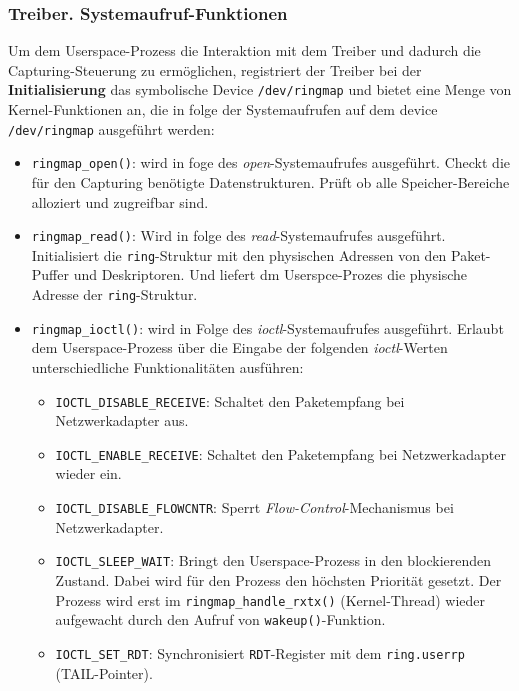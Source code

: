 \subsubsection*{Treiber. Systemaufruf-Funktionen}
Um dem Userspace-Prozess die Interaktion mit dem Treiber und dadurch die
Capturing-Steuerung zu ermöglichen, registriert der Treiber bei der
\textbf{Initialisierung} das symbolische Device \verb+/dev/ringmap+ und bietet
eine Menge von Kernel-Funktionen an, die in folge der Systemaufrufen auf dem
device \verb+/dev/ringmap+ ausgeführt werden:
\begin{itemize}
	\item \verb+ringmap_open()+: wird in foge des \emph{open}-Systemaufrufes
		ausgeführt.  Checkt die für den Capturing benötigte Datenstrukturen.
		Prüft ob alle Speicher-Bereiche alloziert und zugreifbar sind.
	\item \verb+ringmap_read()+: Wird in folge des \emph{read}-Systemaufrufes
		ausgeführt.  Initialisiert die \verb+ring+-Struktur mit den physischen
		Adressen von den Paket-Puffer und Deskriptoren. Und liefert dm
		Userspce-Prozes die physische Adresse der \verb+ring+-Struktur. 
	\item \verb+ringmap_ioctl()+: wird in Folge des \emph{ioctl}-Systemaufrufes
		ausgeführt. Erlaubt dem Userspace-Prozess über die Eingabe der 
		folgenden \emph{ioctl}-Werten unterschiedliche Funktionalitäten ausführen:
		\begin{itemize}
			\item \verb+IOCTL_DISABLE_RECEIVE+: Schaltet den Paketempfang bei
				Netzwerkadapter aus.
			\item \verb+IOCTL_ENABLE_RECEIVE+: Schaltet den Paketempfang bei
				Netzwerkadapter wieder ein.
			\item \verb+IOCTL_DISABLE_FLOWCNTR+: Sperrt
				\emph{Flow-Control}-Mechanismus bei Netzwerkadapter.
			\item \verb+IOCTL_SLEEP_WAIT+: Bringt den Userspace-Prozess in den
				blockierenden Zustand. Dabei wird für den Prozess den höchsten
				Priorität gesetzt. Der Prozess wird erst im \verb+ringmap_handle_rxtx()+ (Kernel-Thread)
				wieder aufgewacht durch den Aufruf von
				\verb+wakeup()+-Funktion.
			\item \verb+IOCTL_SET_RDT+: Synchronisiert \verb+RDT+-Register mit
				dem \verb+ring.userrp+ (TAIL-Pointer).
		\end{itemize}
\end{itemize}

